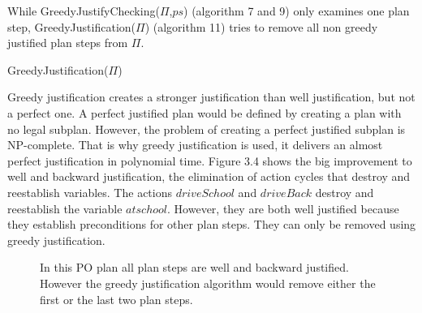 While GreedyJustifyChecking($\Pi$,$ps$) (algorithm 7 and 9) only examines one plan step, GreedyJustification($\Pi$) (algorithm 11) tries to 
remove all non greedy justified plan steps from $\Pi$.


\begin{algorithm}[H]
    \SetAlgoLined
    \Return{$\Pi$}
    \caption{GreedyJustification($\Pi$)}
\end{algorithm}


Greedy justification creates a stronger justification than well justification, but not a perfect one.
A perfect justified plan would be defined by creating a plan with no legal subplan. However, the problem of 
creating a perfect justified subplan is NP-complete. That is why greedy justification is used, it delivers an 
almost perfect justification in polynomial time. Figure 3.4 shows the big improvement to well and backward justification, the 
elimination of action cycles that destroy and reestablish variables. The actions $driveSchool$ and $driveBack$ destroy and 
reestablish the variable $at school$. However, they are both well justified because they establish preconditions for other plan steps.
They can only be removed using greedy justification.
\begin{figure}

    \caption{In this PO plan all plan steps are well and backward justified. However the greedy justification algorithm
    would remove either the first or the last two plan steps.}
\end{figure}
